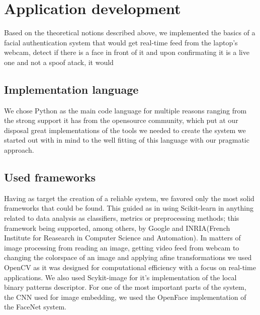 \chapter{Application development}
Based on the theoretical notions described above, we implemented the basics of a facial authentication system that would get real-time feed from the laptop's webcam, detect if there is a face in front of it and upon confirmating it is a live one and not a spoof atack, it would 

\section{Implementation language}
We chose Python as the main code language for multiple reasons ranging from the strong support it has from the opensource community, which put at our disposal great implementations of the tools we needed to create the system we started out with in mind to the well fitting of this language with our pragmatic approach.
\section{Used frameworks}
Having as target the creation of a reliable system, we favored only the most solid frameworks that could be found. This guided as in using Scikit-learn \cite{scikit-learn} in anything related to data analysis as classifiers, metrics or preprocessing methods; this framework being supported, among others, by Google and INRIA(French Institute for Reasearch in Computer Science and Automation). In matters of image processing from reading an image, getting video feed from webcam to changing the colorspace of an image and applying afine transformations we used OpenCV \cite{opencv_library} as it was designed for computational efficiency with a focus on real-time applications. We also used Scykit-image \cite{scikit-image} for it's implementation of the local binary patterns descriptor. For one of the most important parts of the system, the CNN used for image embedding, we used the OpenFace \cite{amos2016openface} implementation of the FaceNet \cite{SchroffKP15} system.
